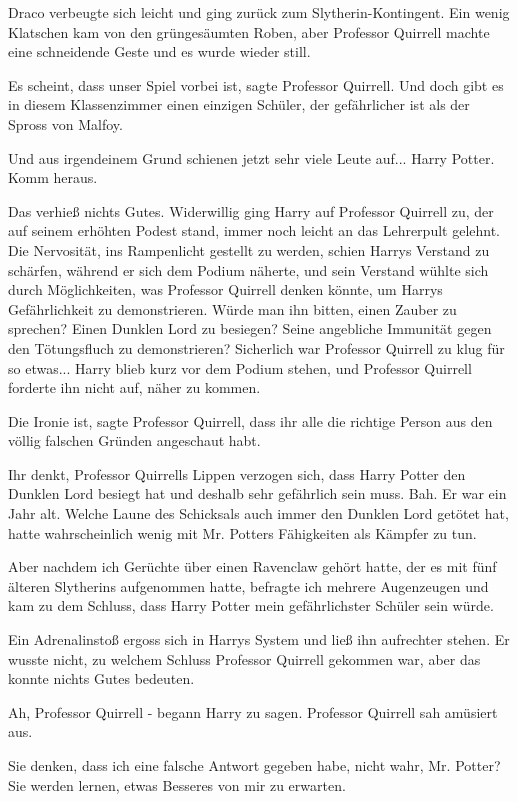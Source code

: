 Draco verbeugte sich leicht und ging zurück zum Slytherin-Kontingent. Ein wenig
Klatschen kam von den grüngesäumten Roben, aber Professor Quirrell machte eine
schneidende Geste und es wurde wieder still.

\glqq Es scheint, dass unser Spiel vorbei ist\grqq{}, sagte Professor Quirrell.
\glqq Und doch gibt es in diesem Klassenzimmer einen einzigen Schüler, der
gefährlicher ist als der Spross von Malfoy.\grqq{}

Und aus irgendeinem Grund schienen jetzt sehr viele Leute auf... \glqq Harry
Potter. Komm heraus.\grqq{}

Das verhieß nichts Gutes. Widerwillig ging Harry auf Professor Quirrell zu, der
auf seinem erhöhten Podest stand, immer noch leicht an das Lehrerpult gelehnt.
Die Nervosität, ins Rampenlicht gestellt zu werden, schien Harrys Verstand zu
schärfen, während er sich dem Podium näherte, und sein Verstand wühlte sich
durch Möglichkeiten, was Professor Quirrell denken könnte, um Harrys
Gefährlichkeit zu demonstrieren. Würde man ihn bitten, einen Zauber zu sprechen?
Einen Dunklen Lord zu besiegen? Seine angebliche Immunität gegen den
Tötungsfluch zu demonstrieren? Sicherlich war Professor Quirrell zu klug für so
etwas... Harry blieb kurz vor dem Podium stehen, und Professor Quirrell forderte
ihn nicht auf, näher zu kommen.

\glqq Die Ironie ist\grqq{}, sagte Professor Quirrell, \glqq dass ihr alle die
richtige Person aus den völlig falschen Gründen angeschaut habt.

Ihr denkt\grqq{}, Professor Quirrells Lippen verzogen sich, \glqq dass Harry
Potter den Dunklen Lord besiegt hat und deshalb sehr gefährlich sein muss. Bah.
Er war ein Jahr alt. Welche Laune des Schicksals auch immer den Dunklen Lord
getötet hat, hatte wahrscheinlich wenig mit Mr. Potters Fähigkeiten als Kämpfer
zu tun.

Aber nachdem ich Gerüchte über einen Ravenclaw gehört hatte, der es mit fünf
älteren Slytherins aufgenommen hatte, befragte ich mehrere Augenzeugen und kam
zu dem Schluss, dass Harry Potter mein gefährlichster Schüler sein würde.\grqq{}

Ein Adrenalinstoß ergoss sich in Harrys System und ließ ihn aufrechter stehen.
Er wusste nicht, zu welchem Schluss Professor Quirrell gekommen war, aber das
konnte nichts Gutes bedeuten.

\glqq Ah, Professor Quirrell -\grqq{} begann Harry zu sagen. Professor Quirrell
sah amüsiert aus.

\glqq Sie denken, dass ich eine falsche Antwort gegeben habe, nicht wahr, Mr.
Potter? Sie werden lernen, etwas Besseres von mir zu erwarten.\grqq{}

